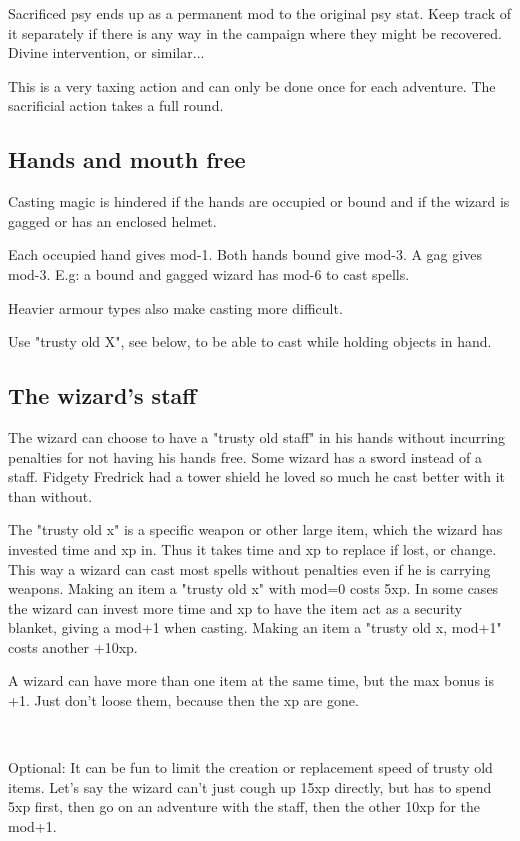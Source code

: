 Sacrificed psy ends up as a permanent mod to the original psy stat. Keep track of it separately if there is any way in the campaign where they might be recovered. Divine intervention, or similar...

This is a very taxing action and can only be done once for each adventure. The sacrificial action takes a full round.


\subsection*{Hands and mouth free}
Casting magic is hindered if the hands are occupied or bound and if the wizard is gagged or has an enclosed helmet.

Each occupied hand gives mod-1. Both hands bound give mod-3. A gag gives mod-3.
E.g: a bound and gagged wizard has mod-6 to cast spells.

Heavier armour types also make casting more difficult.

Use "trusty old X", see below, to be able to cast while holding objects in hand.


\subsection*{The wizard's staff}
The wizard can choose to have a "trusty old staff" in his hands without incurring penalties for not having his hands free. Some wizard has a sword instead of a staff. Fidgety Fredrick had a tower shield he loved so much he cast better with it than without.

The "trusty old x" is a specific weapon or other large item, which the wizard has invested time and xp in. Thus it takes time and xp to replace if lost, or change. This way a wizard can cast most spells without penalties even if he is carrying weapons. Making an item a "trusty old x" with mod=0 costs 5xp. 
In some cases the wizard can invest more time and xp to have the item act as a security blanket, giving a mod+1 when casting. Making an item a "trusty old x, mod+1" costs another +10xp.

A wizard can have more than one item at the same time, but the max bonus is +1. Just don't loose them, because then the xp are gone.

\

Optional: It can be fun to limit the creation or replacement speed of trusty old items. Let's say the wizard can't just cough up 15xp directly, but has to spend 5xp first, then go on an adventure with the staff, then the other 10xp for the mod+1.

